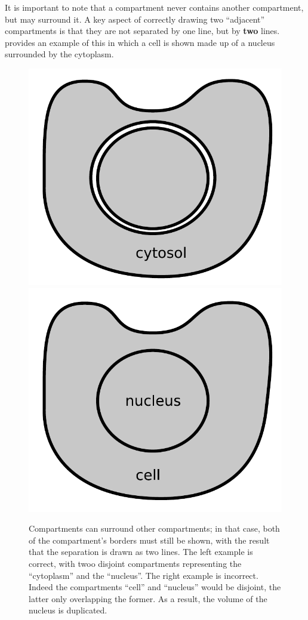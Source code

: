 It is important to note that a compartment never contains another compartment, but may surround it.  A key aspect of correctly drawing two ``adjacent'' compartments is that they are not separated by one line, but by \textbf{two} lines.   provides an example of this in which a cell is shown made up of a nucleus surrounded by the cytoplasm.

\begin{figure}[H]
  \centering
  \includegraphics[scale = 0.4]{examples/compartment-cell}
 \includegraphics[scale = 0.4]{examples/compartment-cell-wrong}
  \caption{Compartments can surround other compartments; in that case, both of the compartment's borders must still be shown, with the result that the separation is drawn as two lines. The left example is correct, with twoo disjoint compartments representing the ``cytoplasm'' and the ``nucleus''. The right example is incorrect. Indeed the compartments ``cell'' and ``nucleus'' would be disjoint, the latter only overlapping the former. As a result, the volume of the nucleus is duplicated.}
  \label{fig:two-comp}
\end{figure}

